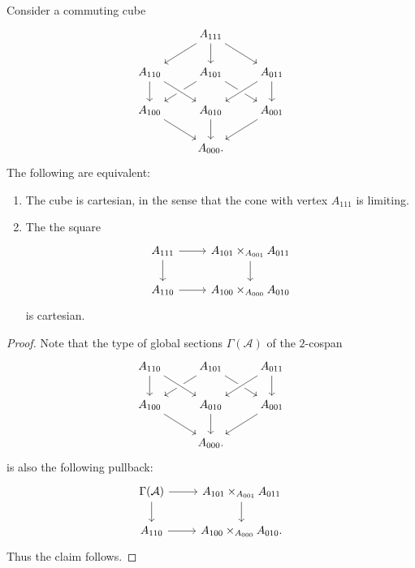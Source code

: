 \begin{thm}
Consider a commuting cube
\begin{equation*}
\begin{tikzcd}
& A_{111} \arrow[dl] \arrow[d] \arrow[dr] \\
A_{110} \arrow[d] & A_{101} \arrow[dl] \arrow[dr] & A_{011} \arrow[d] \\
A_{100} \arrow[dr] & A_{010} \arrow[d] \arrow[from=ul,crossing over] \arrow[from=ur,crossing over] & A_{001} \arrow[dl] \\
& A_{000}.
\end{tikzcd}
\end{equation*}
The following are equivalent:
\begin{enumerate}
\item The cube is cartesian, in the sense that the cone with vertex $A_{111}$ is limiting.
\item The the square
\begin{equation*}
\begin{tikzcd}
A_{111} \arrow[r] \arrow[d] & A_{101}\times_{A_{001}} A_{011} \arrow[d] \\
A_{110} \arrow[r] & A_{100} \times_{A_{000}} A_{010}
\end{tikzcd}
\end{equation*}
is cartesian.
\end{enumerate}
\end{thm}

\begin{proof}
Note that the type of global sections $\Gamma(\mathcal{A})$ of the $2$-cospan
\begin{equation*}
\begin{tikzcd}
A_{110} \arrow[d] & A_{101} \arrow[dl] \arrow[dr] & A_{011} \arrow[d] \\
A_{100} \arrow[dr] & A_{010} \arrow[d] \arrow[from=ul,crossing over] \arrow[from=ur,crossing over] & A_{001} \arrow[dl] \\
& A_{000}.
\end{tikzcd}
\end{equation*}
is also the following pullback:
\begin{equation*}
\begin{tikzcd}
\Gamma(\mathcal{A}) \arrow[r] \arrow[d] & A_{101}\times_{A_{001}} A_{011} \arrow[d] \\
A_{110} \arrow[r] & A_{100} \times_{A_{000}} A_{010}.
\end{tikzcd}
\end{equation*}
Thus the claim follows.
\end{proof}


